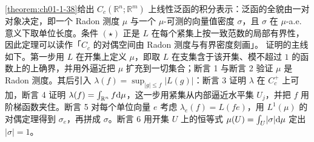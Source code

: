 \documentclass[../../main.tex]{subfiles}%
\begin{document}
\begin{remark}\label{remark:ch01-thm-1-38-动机}
\cref{theorem:ch01-1-38}给出 $C_c(\mathbb{R}^n;\mathbb{R}^m)$ 上线性泛函的积分表示：泛函的全貌由一对对象决定，即一个 Radon 测度 $\mu$ 与一个 $\mu$-可测的向量值密度 $\sigma$，且 $\sigma$ 在 $\mu$-a.e. 意义下取单位长度。条件 $(\star)$ 正是 $L$ 在每个紧集上按一致范数的局部有界性，因此定理可以读作「$C_c$ 的对偶空间由 Radon 测度与有界密度刻画」。%
证明的主线如下。第一步用 $L$ 在开集上定义 $\mu$，即取 $L$ 在支集含于该开集、模不超过 $1$ 的函数上的上确界，并用外逼近把 $\mu$ 扩充到一切集合；断言 1 与断言 2 验证 $\mu$ 是 Radon 测度。其后引入 $\lambda(f)=\sup_{\lvert g\rvert\leqslant f}\lvert L(g)\rvert$：断言 3 证明 $\lambda$ 在 $C_c^+$ 上可加，断言 4 证明 $\lambda(f)=\int_{\mathbb{R}^n}f\mathrm{d}\mu$，这一步用紧集从内部逼近水平集 $U_j$，并把 $f$ 用阶梯函数夹住。断言 5 对每个单位向量 $e$ 考虑 $\lambda_e(f)=L(fe)$，用 $L^1(\mu)$ 的对偶定理得到 $\sigma_e$，再拼成 $\sigma$。断言 6 用开集 $U$ 上的恒等式 $\mu(U)=\int_U\lvert\sigma\rvert\mathrm{d}\mu$ 定出 $\lvert\sigma\rvert=1$。
\end{remark}
\end{document}
